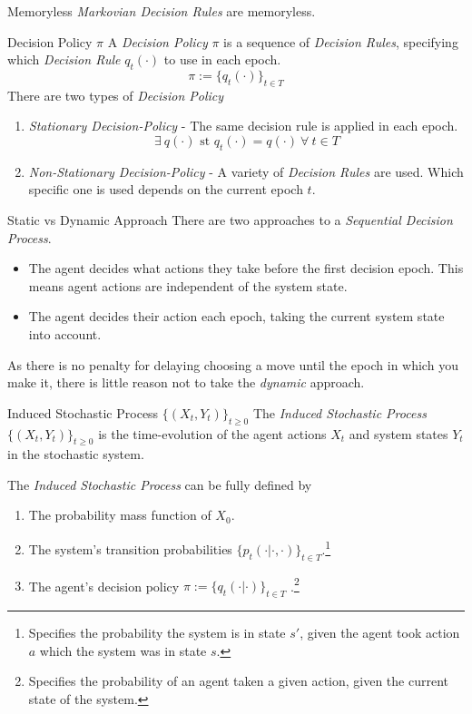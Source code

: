\documentclass[11pt,a4paper]{article}
\begin{document}
  \begin{remark}{Memoryless}
    \textit{Markovian Decision Rules} are memoryless.
  \end{remark}

  \begin{definition}{Decision Policy $\pi$}
    A \textit{Decision Policy} $\pi$ is a sequence of \textit{Decision Rules}, specifying which \textit{Decision Rule} $q_t(\cdot)$ to use in each epoch.
    \[ \pi:=\{q_t(\cdot)\}_{t\in T} \]
    There are two types of \textit{Decision Policy}
    \begin{enumerate}
      \item \textit{Stationary Decision-Policy} - The same decision rule is applied in each epoch.
      \[ \exists\ q(\cdot)\text{ st }q_t(\cdot)=q(\cdot)\ \forall\ t\in T \]
      \item \textit{Non-Stationary Decision-Policy} - A variety of \textit{Decision Rules} are used. Which specific one is used depends on the current epoch $t$.
    \end{enumerate}
  \end{definition}

  \begin{remark}{Static vs Dynamic Approach}
    There are two approaches to a \textit{Sequential Decision Process}.
    \begin{itemize}
      \item[\textit{Static}] The agent decides what actions they take before the first decision epoch. This means agent actions are independent of the system state.
      \item[\textit{Dynamic}] The agent decides their action each epoch, taking the current system state into account.
    \end{itemize}
    As there is no penalty for delaying choosing a move until the epoch in which you make it, there is little reason not to take the \textit{dynamic} approach.
  \end{remark}

  \begin{definition}{Induced Stochastic Process $\{(X_t,Y_t)\}_{t\geq0}$}
    The \textit{Induced Stochastic Process} $\{(X_t,Y_t)\}_{t\geq0}$ is the time-evolution of the agent actions $X_t$ and system states $Y_t$ in the stochastic system.
    \par The \textit{Induced Stochastic Process} can be fully defined by
    \begin{enumerate}
      \item The probability mass function of $X_0$.
      \item The system's transition probabilities $\{p_t(\cdot|\cdot,\cdot)\}_{t\in T}$.\footnote{Specifies the probability the system is in state $s'$, given the agent took action $a$ which the system was in state $s$.}
      \item The agent's decision policy $\pi:=\{q_t(\cdot|\cdot)\}_{t\in T}$ .\footnote{Specifies the probability of an agent taken a given action, given the current state of the system.}
    \end{enumerate}
  \end{definition}
\end{document}
